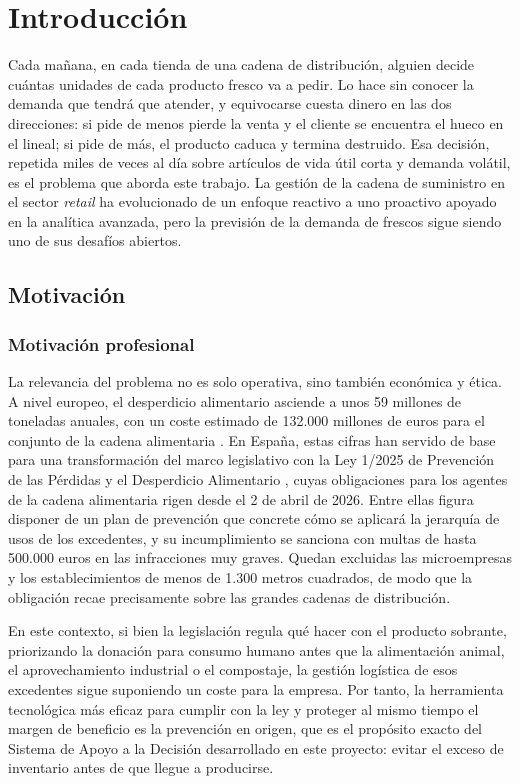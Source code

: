 \chapter{Introducción}
\label{chap:introduccion}

Cada mañana, en cada tienda de una cadena de distribución, alguien decide cuántas unidades de cada
producto fresco va a pedir. Lo hace sin conocer la demanda que tendrá que atender, y equivocarse
cuesta dinero en las dos direcciones: si pide de menos pierde la venta y el cliente se encuentra el
hueco en el lineal; si pide de más, el producto caduca y termina destruido. Esa decisión, repetida
miles de veces al día sobre artículos de vida útil corta y demanda volátil, es el problema que
aborda este trabajo. La gestión de la cadena de suministro en el sector \textit{retail} ha
evolucionado de un enfoque reactivo a uno proactivo apoyado en la analítica avanzada, pero la
previsión de la demanda de frescos sigue siendo uno de sus desafíos abiertos.

\section{Motivación}

\subsection{Motivación profesional}
La relevancia del problema no es solo operativa, sino también económica y ética. A nivel europeo, el
desperdicio alimentario asciende a unos 59 millones de toneladas anuales, con un coste estimado de
132.000 millones de euros para el conjunto de la cadena alimentaria
\cite{eucommission2023foodwaste}. En España, estas cifras han servido de base para una
transformación del marco legislativo con la Ley 1/2025 de Prevención de las Pérdidas y el
Desperdicio Alimentario \cite{leydesperdicio2025}, cuyas obligaciones para los agentes de la cadena
alimentaria rigen desde el 2 de abril de 2026. Entre ellas figura disponer de un plan de prevención
que concrete cómo se aplicará la jerarquía de usos de los excedentes, y su incumplimiento se
sanciona con multas de hasta 500.000 euros en las infracciones muy graves. Quedan excluidas las
microempresas y los establecimientos de menos de 1.300 metros cuadrados, de modo que la obligación
recae precisamente sobre las grandes cadenas de distribución.

En este contexto, si bien la legislación regula qué hacer con el producto sobrante, priorizando la
donación para consumo humano antes que la alimentación animal, el aprovechamiento industrial o el
compostaje, la gestión logística de esos excedentes sigue suponiendo un coste para la empresa. Por
tanto, la herramienta tecnológica más eficaz para cumplir con la ley y proteger al mismo tiempo el
margen de beneficio es la prevención en origen, que es el propósito exacto del Sistema de Apoyo a la
Decisión desarrollado en este proyecto: evitar el exceso de inventario antes de que llegue a
producirse.

